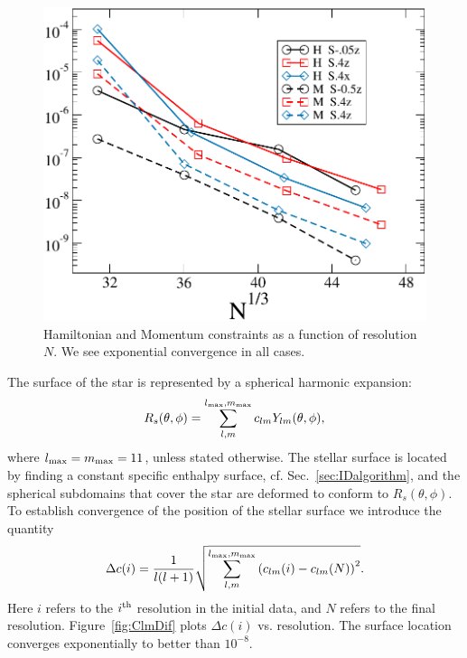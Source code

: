 \begin{figure}
\includegraphics[width=0.95\columnwidth]{chap2/HamMom}
\caption[Convergence of the Hamiltonian and Momentum constraints.]{{\label{fig:HamMom}}Hamiltonian and Momentum constraints as a function of resolution $N$. We see exponential
  convergence in all cases.}
\end{figure}

 The surface of the star is represented by a spherical harmonic expansion:
\begin{equation}
R_s(\theta,\phi) = \sum^{l_{\rm max},m_{\rm
    max}}_{l,m}c_{lm}Y_{lm}(\theta,\phi),
\end{equation}
where $l_{\rm max}= m_{\rm max} = 11$, unless stated otherwise.
The stellar surface is located by finding a constant specific enthalpy surface, cf. Sec.~\ref{sec:IDalgorithm}, and the spherical subdomains that cover the star are deformed to conform to $R_s(\theta,\phi)$.
To establish convergence of the position of the stellar surface we
introduce the quantity
\begin{equation}
\label{eq:Deltac}
\Delta c(i) = \frac{1}{l(l+1)} \sqrt{\sum^{l_{\rm max},m_{\rm
      max}}_{l,m}\left(c_{lm}(i)-c_{lm}(N)\right)^2}.
\end{equation}
Here $i$ refers to the $i^{\rm th}$ resolution in the initial data,
and $N$ refers to the final resolution. Figure~\ref{fig:ClmDif} plots $\Delta c(i)$ vs. resolution. The surface location converges exponentially to better than $10^{-8}$.

